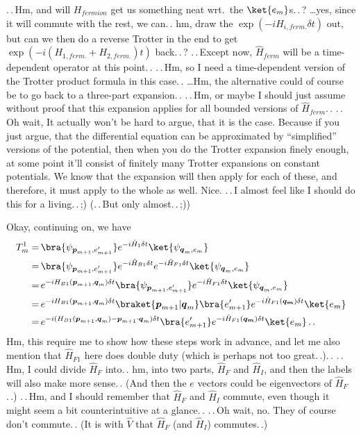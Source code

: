 \documentclass{report}
\begin{document}
.\,.\,Hm, and will $H_{fermion}$ get us something neat wrt.\ the $\ket{e_m}$s.\,.\,? \ldots yes, since it will commute with the rest, we can.\,. hm, draw the $\exp(-i H_{i, ferm.} \delta t)$ out, but can we then do a reverse Trotter in the end to get $\exp(-i (H_{1, ferm.} + H_{2, ferm.}) t)$ back.\,.\,? .\,.\,Except now, $\hat H_{ferm}$ will be a time-dependent operator at this point.\,. .\,.\,Hm, so I need a time-dependent version of the Trotter product formula in this case.\,. \ldots Hm, the alternative could of course be to go back to a three-part expansion.\,. .\,.\,Hm, or maybe I should just assume without proof that this expansion applies for all bounded versions of $\hat H_{ferm}$.\,. .\,.\,Oh wait, It actually won't be hard to argue, that it is the case. Because if you just argue, that the differential equation can be approximated by ``simplified'' versions of the potential, then when you do the Trotter expansion finely enough, at some point it'll consist of finitely many Trotter expansions on constant potentials. We know that the expansion will then apply for each of these, and therefore, it must apply to the whole as well. Nice. .\,.\,I almost feel like I should do this for a living.\,.\,;) (.\,.\,But only almost.\,.\,;))

Okay, continuing on, we have
\begin{align}
\begin{aligned}
	T^1_{m} =&\,
		\bra{\psi_{\boldsymbol{p}_{m+1}, e_{m+1}'}}
			e^{-i  \hat H_{1} \delta t}
		\ket{\psi_{\boldsymbol{q}_{m}, e_{m}}} 
	\\=&\,
		\bra{\psi_{\boldsymbol{p}_{m+1}, e_{m+1}'}}
			e^{-i  \hat H_{B1} \delta t} e^{-i  \hat H_{F1} \delta t}
		\ket{\psi_{\boldsymbol{q}_{m}, e_{m}}} 
	\\=&\,
		e^{-i  H_{B1}(\boldsymbol{p}_{m+1}, \boldsymbol{q}_{m}) \delta t} 
		\bra{\psi_{\boldsymbol{p}_{m+1}, e_{m+1}'}}
			e^{-i  \hat H_{F1} \delta t}
		\ket{\psi_{\boldsymbol{q}_{m}, e_{m}}} 
	\\=&\,
		e^{-i  H_{B1}(\boldsymbol{p}_{m+1}, \boldsymbol{q}_{m}) \delta t} 
		\braket{\boldsymbol{p}_{m+1} | \boldsymbol{q}_{m}}
		\bra{e_{m+1}'}
			e^{-i  \hat H_{F1}(\boldsymbol{q_m}) \delta t}
		\ket{e_{m}} 
	\\=&\,
		e^{-i  (H_{B1}(\boldsymbol{p}_{m+1}, \boldsymbol{q}_{m}) - \boldsymbol{p}_{m+1} \cdot \boldsymbol{q}_m) \delta t} 
		\bra{e_{m+1}'}
			e^{-i  \hat H_{F1}(\boldsymbol{q_m}) \delta t} 
		\ket{e_{m}}  \,.\,.
	\label{T1_m_calculation_01}
\end{aligned}
\end{align} 
Hm, this require me to show how these steps work in advance, and let me also mention that $\hat H_{F1}$ here does double duty (which is perhaps not too great.\,.).\,. .\,.\,Hm, I could divide $\hat H_{F}$ into.\,. hm, into two parts, $\hat H_F$ and $\hat H_I$, and then the labels will also make more sense.\,. (And then the $e$ vectors could be eigenvectors of $\hat H_F$.\,.) .\,.\,Hm, and I should remember that $\hat H_F$ and $\hat H_I$ commute, even though it might seem a bit counterintuitive at a glance.\,. .\,.\,Oh wait, no. They of course don't commute.\,. (It is with $\hat V$ that $\hat H_F$ (and $\hat H_I$) commutes.\,.)
\end{document}
